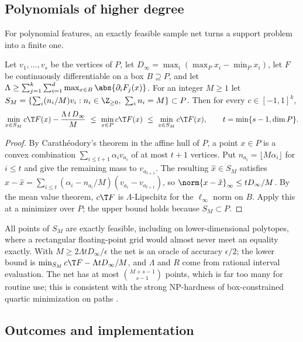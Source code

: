 \subsection{Polynomials of higher degree}

For polynomial features, an exactly feasible sample net turns a support
problem into a finite one.

\begin{lemma}\label{lem:net}
Let $v_1,\dots,v_s$ be the vertices of $P$, let
$D_\infty=\max_i(\max_Px_i-\min_Px_i)$, let $F$ be continuously
differentiable on a box $B\supseteq P$, and let
$\Lambda\ge\sum_{j=1}^k\sum_{i=1}^d\max_{x\in B}\abs{\partial_iF_j(x)}$. For an
integer $M\ge1$ let $S_M=\{\sum_i(n_i/M)v_i:n_i\in\Z_{\ge0},\ \sum_in_i=M\}\subset P$.
Then for every $c\in[-1,1]^k$,
\[
\min_{x\in S_M}c\T F(x)-\frac{\Lambda\,t\,D_\infty}M\ \le\ \min_{x\in P}c\T F(x)\ \le\ \min_{x\in S_M}c\T F(x),
\qquad t=\min\{s-1,\dim P\}.
\]
\end{lemma}

\begin{proof}
By Carath\'eodory's theorem in the affine hull of $P$, a point $x\in P$ is
a convex combination $\sum_{i\le t+1}\alpha_iv_{a_i}$ of at most $t+1$
vertices. Put $n_{a_i}=\lfloor M\alpha_i\rfloor$ for $i\le t$ and give the
remaining mass to $v_{a_{t+1}}$. The resulting $\hat x\in S_M$ satisfies
$x-\hat x=\sum_{i\le t}(\alpha_i-n_{a_i}/M)(v_{a_i}-v_{a_{t+1}})$, so
$\norm{x-\hat x}_\infty\le tD_\infty/M$. By the mean value theorem, $c\T F$
is $\Lambda$-Lipschitz for the $\ell_\infty$ norm on $B$. Apply this at a
minimizer over $P$; the upper bound holds because $S_M\subset P$.
\end{proof}

All points of $S_M$ are exactly feasible, including on lower-dimensional
polytopes, where a rectangular floating-point grid would almost never meet
an equality exactly. With $M\ge2\Lambda tD_\infty/\epsilon$ the net is an
oracle of accuracy $\epsilon/2$; the lower bound is
$\min_{S_M}c\T F-\Lambda tD_\infty/M$, and $\Lambda$ and $R$ come from rational
interval evaluation. The net has at most $\binom{M+s-1}{s-1}$ points, which
is far too many for routine use; this is consistent with the strong
NP-hardness of box-constrained quartic minimization on paths
\citep{DelPiaKhajavirad2026}.

\subsection{Outcomes and implementation}

